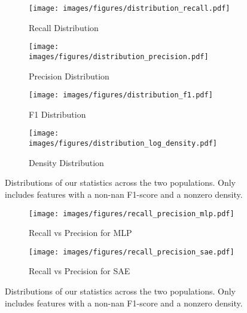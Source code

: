 \begin{figure}[h]
    \centering
    
    \begin{subfigure}[b]{0.45\textwidth}
        \centering
        \texttt{[image: images/figures/distribution\_recall.pdf]}
        \caption{Recall Distribution}
        \label{fig:distributions_recall}
    \end{subfigure}
    \begin{subfigure}[b]{0.45\textwidth}
        \centering
        \texttt{[image: images/figures/distribution\_precision.pdf]}
        \caption{Precision Distribution}
        \label{fig:distributions_precision}
    \end{subfigure}
    
    \begin{subfigure}[b]{0.45\textwidth}
        \centering
        \texttt{[image: images/figures/distribution\_f1.pdf]}
        \caption{F1 Distribution}
        \label{fig:distributions_f1}
    \end{subfigure}
    \begin{subfigure}[b]{0.45\textwidth}
        \centering
        \texttt{[image: images/figures/distribution\_log\_density.pdf]}
        \caption{Density Distribution}
        \label{fig:distributions_log_density}
    \end{subfigure}
    
    \caption{Distributions of our statistics across the two populations. Only includes features with a non-nan F1-score and a nonzero density.}
    \label{fig:distributions}
\end{figure}

\begin{figure}[h]
    \centering
    
    \begin{subfigure}[b]{0.45\textwidth}
        \centering
        \texttt{[image: images/figures/recall\_precision\_mlp.pdf]}
        \caption{Recall vs Precision for MLP}
        \label{fig:recall_precision_mlp}
    \end{subfigure}
    \begin{subfigure}[b]{0.45\textwidth}
        \centering
        \texttt{[image: images/figures/recall\_precision\_sae.pdf]}
        \caption{Recall vs Precision for SAE}
        \label{fig:recall_precision_sae}
    \end{subfigure}
    
    \caption{Distributions of our statistics across the two populations. Only includes features with a non-nan F1-score and a nonzero density.}
    \label{fig:recall_precision}
\end{figure}

